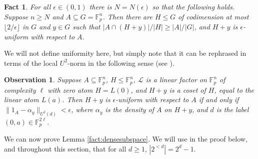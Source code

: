 \documentclass[12pt,oneside,british,a4wide]{amsart}
\newtheorem{observation}[theorem]{Observation}
\newtheorem{fact}[theorem]{Fact}
\numberwithin{equation}{section}
\theoremstyle{definition}
\def\F{\mathbb{F}}
\def\e{\epsilon}
\newcommand{\calL}{\mathcal{L}}
\begin{document}
\begin{fact}\label{lem:lemma7}
For all $\e\in (0,1)$ there is $N=N(\e)$ so that the following holds.  Suppose $n\geq N$ and $A\subseteq G=\F_p^n$.  Then there are $H\leqslant G$ of codimension at most $\lfloor 2/\e\rfloor$ in $G$ and $y\in G$ such that $|A\cap (H+y)|/|H|\geq |A|/|G|$, and $H+y$ is $\e$-uniform with respect to $A$.
\end{fact}

We will not define uniformity here, but simply note that it can be rephrased in terms of the local $U^2$-norm in the following sense (see \cite[Lemma 3.4]{Terry.2021d}).

\begin{observation}\label{ob:uniformu2}
Suppose $A\subseteq \F_p^n$,  $H \leqslant \F_p^n$, $\calL$ is a linear factor on $\F_p^n$ of complexity $\ell$ with zero atom $H=L(0)$, and $H+y$ is a coset of $H$, equal to the linear atom $L(a)$.  Then $H+y$ is $\e$-uniform with respect to $A$ if and only if $\|1_A-\alpha_y\|_{U^2(d)}<\e$, where $\alpha_y$ is the density of $A$ on $H+y$, and $d$ is the label $(0,a)\in \F_p^{2\ell}$.
\end{observation}


We can now prove Lemma \ref{fact:densesubspace}.  We will use in the proof below, and throughout this section, that for all $d\geq 1$, $|2^{<d}|=2^d-1$. 
\end{document}
